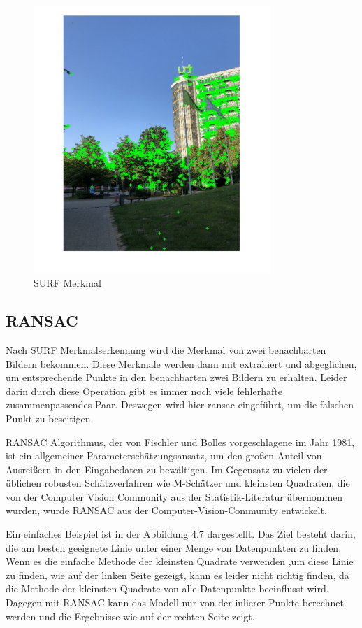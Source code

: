 \begin{figure}[H]
 \centering 
 \includegraphics[keepaspectratio,width=0.8\textwidth]{images/4_ZweiteErfahrung/SURF_Detektion.pdf}
 \caption{SURF Merkmal}
 \label{fig:SURF Merkmal}
\end{figure} 


\subsection{RANSAC}

Nach SURF Merkmalserkennung wird die Merkmal von zwei benachbarten Bildern bekommen. Diese Merkmale werden dann mit extrahiert und abgeglichen, um entsprechende Punkte in den benachbarten zwei Bildern zu erhalten. Leider darin durch diese Operation gibt es immer noch viele fehlerhafte zusammenpassendes Paar. Deswegen wird hier \gls{ransac} eingeführt, um die falschen Punkt zu beseitigen.

RANSAC Algorithmus, der von Fischler und Bolles \cite{ransac1} vorgeschlagene im Jahr 1981, ist ein allgemeiner Parameterschätzungsansatz, um den großen Anteil von Ausreißern in den Eingabedaten zu bewältigen. Im Gegensatz zu vielen der üblichen robusten Schätzverfahren wie M-Schätzer und kleinsten Quadraten, die von der Computer Vision Community aus der Statistik-Literatur übernommen wurden, wurde RANSAC aus der Computer-Vision-Community entwickelt. 

Ein einfaches Beispiel ist in der Abbildung 4.7 dargestellt. Das Ziel besteht darin, die am besten geeignete Linie unter einer Menge von Datenpunkten zu finden. Wenn es die einfache Methode der kleinsten Quadrate verwenden ,um diese Linie zu finden, wie auf der linken Seite gezeigt, kann es leider nicht richtig finden, da die Methode der kleinsten Quadrate von alle Datenpunkte beeinflusst wird. Dagegen mit RANSAC kann das Modell nur von der inlierer Punkte berechnet werden und die Ergebnisse wie auf der rechten Seite zeigt. 

